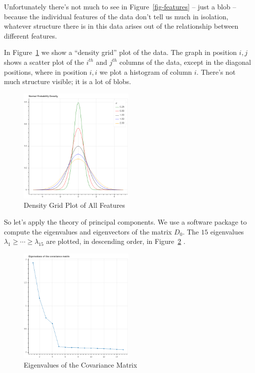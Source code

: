 \documentclass[
  11pt,
  letterpaper,
]{scrbook}
\theoremstyle{plain}
\theoremstyle{plain}
\theoremstyle{remark}
\begin{document}
Unfortunately there's not much to see in Figure~\ref{fig-features} --
just a blob -- because the individual features of the data don't tell us
much in isolation, whatever structure there is in this data arises out
of the relationship between different features.

In Figure~\ref{fig-densitygrid} we show a ``density grid'' plot of the
data. The graph in position \(i,j\) shows a scatter plot of the
\(i^{th}\) and \(j^{th}\) columns of the data, except in the diagonal
positions, where in position \(i,i\) we plot a histogram of column
\(i\). There's not much structure visible; it is a lot of blobs.

\begin{figure}

{\centering \includegraphics[width=0.5\textwidth,height=\textheight]{chapters/img/density.png}

}

\caption{\label{fig-densitygrid}Density Grid Plot of All Features}

\end{figure}

So let's apply the theory of principal components. We use a software
package to compute the eigenvalues and eigenvectors of the matrix
\(D_{0}\). The \(15\) eigenvalues
\(\lambda_{1}\ge \cdots \ge \lambda_{15}\) are plotted, in descending
order, in Figure~\ref{fig-eigenvalues} .

\begin{figure}

{\centering \includegraphics[width=0.5\textwidth,height=\textheight]{chapters/img/eigenvalues.png}

}

\caption{\label{fig-eigenvalues}Eigenvalues of the Covariance Matrix}

\end{figure}
\end{document}
